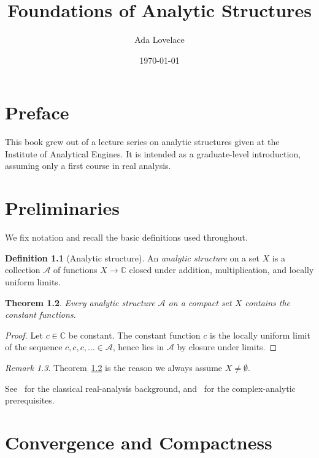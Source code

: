 \documentclass{amsbook}
\title{Foundations of Analytic Structures}
\author{Ada Lovelace}
\date{\today}
\newtheorem{theorem}{Theorem}[chapter]
\theoremstyle{definition}
\newtheorem{definition}[theorem]{Definition}
\theoremstyle{remark}
\newtheorem{remark}[theorem]{Remark}
\begin{document}
\frontmatter

\maketitle

\chapter*{Preface}
This book grew out of a lecture series on analytic structures given at the
Institute of Analytical Engines. It is intended as a graduate-level
introduction, assuming only a first course in real analysis.

\tableofcontents

\mainmatter

\chapter{Preliminaries}
\label{ch:preliminaries}

We fix notation and recall the basic definitions used throughout.

\begin{definition}[Analytic structure]
\label{def:analytic-structure}
An \emph{analytic structure} on a set $X$ is a collection $\mathcal{A}$ of
functions $X \to \mathbb{C}$ closed under addition, multiplication, and
locally uniform limits.
\end{definition}

\begin{theorem}
\label{thm:first}
Every analytic structure $\mathcal{A}$ on a compact set $X$ contains the
constant functions.
\end{theorem}

\begin{proof}
Let $c \in \mathbb{C}$ be constant. The constant function $c$ is the locally
uniform limit of the sequence $c, c, c, \dots \in \mathcal{A}$, hence lies in
$\mathcal{A}$ by closure under limits.
\end{proof}

\begin{remark}
Theorem~\ref{thm:first} is the reason we always assume $X \neq \emptyset$.
\end{remark}

See~\cite{rudin1976principles} for the classical real-analysis background,
and~\cite{ahlfors1979complex} for the complex-analytic prerequisites.

\chapter{Convergence and Compactness}
\label{ch:convergence}
\end{document}
